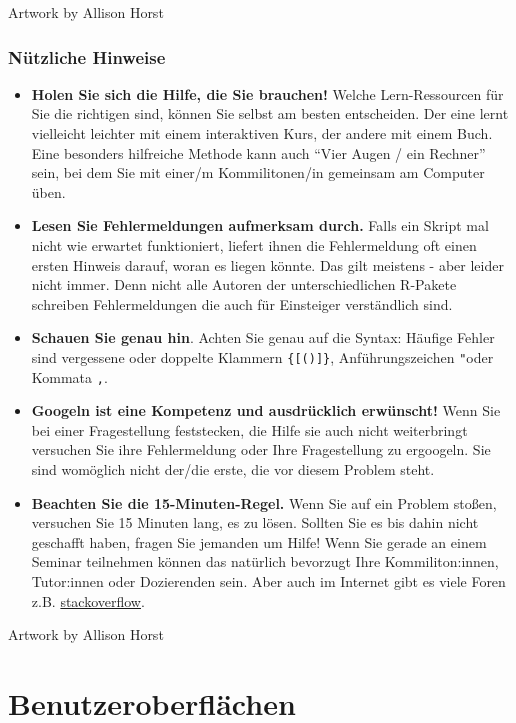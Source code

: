 \documentclass[
]{book}
\begin{document}
Artwork by Allison Horst

\hypertarget{nuxfctzliche-hinweise}{%
\subsection{Nützliche Hinweise}\label{nuxfctzliche-hinweise}}

\begin{itemize}
\item
  \textbf{Holen Sie sich die Hilfe, die Sie brauchen!}
  Welche Lern-Ressourcen für Sie die richtigen sind, können Sie selbst am besten entscheiden. Der eine lernt vielleicht leichter mit einem interaktiven Kurs, der andere mit einem Buch. Eine besonders hilfreiche Methode kann auch ``Vier Augen / ein Rechner'' sein, bei dem Sie mit einer/m Kommilitonen/in gemeinsam am Computer üben.
\item
  \textbf{Lesen Sie Fehlermeldungen aufmerksam durch.}
  Falls ein Skript mal nicht wie erwartet funktioniert, liefert ihnen die Fehlermeldung oft einen ersten Hinweis darauf, woran es liegen könnte. Das gilt meistens - aber leider nicht immer. Denn nicht alle Autoren der unterschiedlichen R-Pakete schreiben Fehlermeldungen die auch für Einsteiger verständlich sind.
\item
  \textbf{Schauen Sie genau hin}.
  Achten Sie genau auf die Syntax: Häufige Fehler sind vergessene oder doppelte Klammern \texttt{\{{[}(){]}\}}, Anführungszeichen \texttt{"}oder Kommata \texttt{,}.
\item
  \textbf{Googeln ist eine Kompetenz und ausdrücklich erwünscht!}
  Wenn Sie bei einer Fragestellung feststecken, die Hilfe sie auch nicht weiterbringt versuchen Sie ihre Fehlermeldung oder Ihre Fragestellung zu ergoogeln. Sie sind womöglich nicht der/die erste, die vor diesem Problem steht.
\item
  \textbf{Beachten Sie die 15-Minuten-Regel.}
  Wenn Sie auf ein Problem stoßen, versuchen Sie 15 Minuten lang, es zu lösen. Sollten Sie es bis dahin nicht geschafft haben, fragen Sie jemanden um Hilfe! Wenn Sie gerade an einem Seminar teilnehmen können das natürlich bevorzugt Ihre Kommiliton:innen, Tutor:innen oder Dozierenden sein. Aber auch im Internet gibt es viele Foren z.B. \href{https://stackoverflow.com/}{stackoverflow}.
\end{itemize}

Artwork by Allison Horst

\hypertarget{benutzeroberfluxe4chen}{%
\chapter{Benutzeroberflächen}\label{benutzeroberfluxe4chen}}
\end{document}
